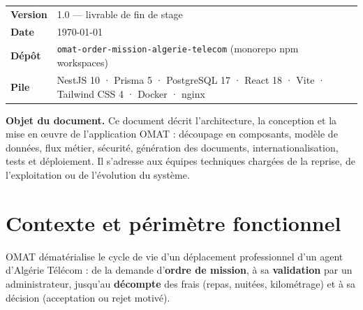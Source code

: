 \documentclass[10.5pt,a4paper]{article}
\newcommand{\code}[1]{\texttt{\small #1}}
\begin{document}
\thispagestyle{empty}
\vspace*{6.6cm}

\begin{tabularx}{\textwidth}{@{}lX@{}}
\textbf{Version} & 1.0 --- livrable de fin de stage \\
\textbf{Date} & \today \\
\textbf{Dépôt} & \code{omat-order-mission-algerie-telecom} (monorepo npm workspaces) \\
\textbf{Pile} & NestJS 10 · Prisma 5 · PostgreSQL 17 · React 18 · Vite · Tailwind CSS 4 · Docker · nginx \\
\end{tabularx}

\vspace{8pt}
\begin{note}
\textbf{Objet du document.} Ce document décrit l'architecture, la conception et la mise en
œuvre de l'application OMAT : découpage en composants, modèle de données, flux métier,
sécurité, génération des documents, internationalisation, tests et déploiement.
Il s'adresse aux équipes techniques chargées de la reprise, de l'exploitation ou de l'évolution du système.
\end{note}

\vspace{2pt}
\renewcommand{\contentsname}{Sommaire}
{\small\setlength{\parskip}{0pt}\tableofcontents}

\newpage
\section{Contexte et périmètre fonctionnel}

OMAT dématérialise le cycle de vie d'un déplacement professionnel d'un agent d'Algérie Télécom :
de la demande d'\textbf{ordre de mission}, à sa \textbf{validation} par un administrateur, jusqu'au
\textbf{décompte} des frais (repas, nuitées, kilométrage) et à sa décision (acceptation ou rejet motivé).
\end{document}
